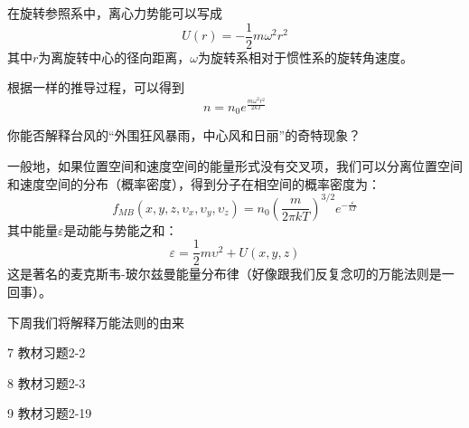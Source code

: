 \documentclass[CJK]{beamer}
\begin{document}
\begin{frame}
\bch
在旋转参照系中，离心力势能可以写成
$$U(r) = -\frac{1}{2}m\omega^2r^2$$
其中$r$为离旋转中心的径向距离，$\omega$为旋转系相对于惯性系的旋转角速度。

\skipline

根据一样的推导过程，可以得到
$$n = n_0 e^{\frac{m\omega^2r^2}{2kT}}$$
\ech
\end{frame}


\begin{frame}
\bch
{}
你能否解释台风的“外围狂风暴雨，中心风和日丽”的奇特现象？
\ech
\end{frame}

\begin{frame}
\bch
一般地，如果位置空间和速度空间的能量形式没有交叉项，我们可以分离位置空间和速度空间的分布（概率密度），得到分子在相空间的概率密度为：
$$f_{MB}(x, y, z,\upsilon_x, \upsilon_y,\upsilon_z) = n_0 \left(\frac{m}{2\pi kT}\right)^{3/2} e^{-\frac{\varepsilon}{kT}} $$
其中能量$\varepsilon$是动能与势能之和：
$$\varepsilon = \frac{1}{2}m\upsilon^2 + U(x,y,z)$$
这是著名的麦克斯韦-玻尔兹曼能量分布律（\wulian 好像跟我们反复念叨的万能法则是一回事）。
\ech
\end{frame}


\begin{frame}
\bch

下周我们将解释万能法则的由来
\ech
\end{frame}

\begin{frame}
\bch

\bitem
\item[7]{教材习题2-2}
\item[8]{教材习题2-3}
\item[9]{教材习题2-19}
\eitem

\ech
\end{frame}
\end{document}
